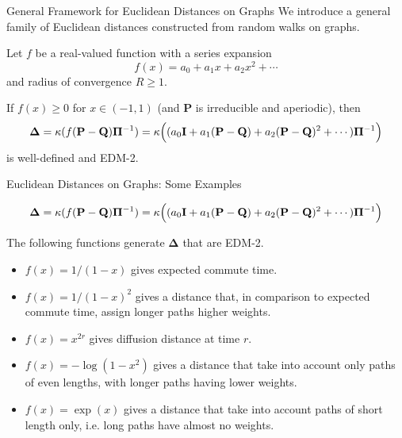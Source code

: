 \documentclass[professionalfonts,hyperref={pdfpagelabels=false,colorlinks=true,linkcolor=red}]{beamer}
\begin{document}
\begin{frame}{General Framework for Euclidean Distances on Graphs}
  We introduce a general family of Euclidean distances constructed
  from random walks on graphs. 
  
  \vskip10pt Let $f$ be a real-valued function with a
    series expansion
    \begin{equation*}
      f(x) = a_0 + a_1 x + a_2 x^2 + \cdots
    \end{equation*}
    and radius of convergence $R \geq 1$. 
  
    \vskip10pt
    If $f(x) \geq 0$ for $x \in (-1,1)$ (and $\mathbf{P}$
    is irreducible and aperiodic), then
    \begin{equation*}
      \bm{\Delta} = \kappa(f(\mathbf{P} - \mathbf{Q}) \bm{\Pi}^{-1}) =
      \kappa\Bigl((a_0
      \mathbf{I} + a_1 (\mathbf{P} - \mathbf{Q}) + a_2 (\mathbf{P} -
      \mathbf{Q})^2 + \cdots)\bm{\Pi}^{-1}\Bigr)
    \end{equation*}
    is well-defined and EDM-2.
\end{frame}

\begin{frame}{Euclidean Distances on Graphs: Some Examples}
 
 \begin{equation*}
      \bm{\Delta} = \kappa(f(\mathbf{P} - \mathbf{Q}) \bm{\Pi}^{-1}) =
      \kappa\Bigl((a_0
      \mathbf{I} + a_1 (\mathbf{P} - \mathbf{Q}) + a_2 (\mathbf{P} -
      \mathbf{Q})^2 + \cdots)\bm{\Pi}^{-1}\Bigr)
    \end{equation*}

  \vskip 10pt The following functions generate $\bm{\Delta}$ that are
  EDM-2.
  \begin{itemize}
  \item $f(x) = 1/(1-x)$ gives expected commute time.
  \item $f(x) = 1/(1-x)^2$ gives a distance that, in comparison to
    expected commute time, assign longer paths higher weights.
  \item $f(x) = x^{2r}$ gives diffusion distance at time $r$.
  \item $f(x) = - \log{(1-x^2)}$ gives a distance that 
    take into account only paths of even lengths, with longer paths having
    lower weights.
  \item $f(x) = \exp(x)$ gives a distance that take into
    account paths of short length only, i.e. long paths have almost
    no weights.
  \end{itemize}
  \end{frame}
\end{document}
